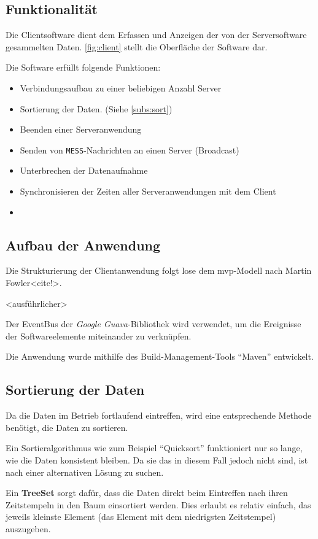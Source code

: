 \subsection{Funktionalität}
Die Clientsoftware dient dem Erfassen und Anzeigen der von der Serversoftware
gesammelten Daten. \autoref{fig:client} stellt die Oberfläche der Software dar.

\begin{minipage}[l]{\textwidth}
Die Software erfüllt folgende Funktionen:
\begin{itemize}
  \item Verbindungsaufbau zu einer beliebigen Anzahl Server
  \item Sortierung der Daten. (Siehe \autoref{subs:sort})
  \item Beenden einer Serveranwendung
  \item Senden von \texttt{MESS}-Nachrichten an einen Server (Broadcast)
  \item Unterbrechen der Datenaufnahme
  \item Synchronisieren der Zeiten aller Serveranwendungen mit dem Client
  \item <weitere Funktionen> 
\end{itemize}
\end{minipage}
\subsection{Aufbau der Anwendung}
Die Strukturierung der Clientanwendung folgt lose dem \gls{mvp}-Modell nach
Martin Fowler<cite!>.

<ausführlicher>

Der EventBus der \emph{Google Guava}-Bibliothek wird verwendet, um die
Ereignisse der Softwareelemente miteinander zu verknüpfen.

Die Anwendung wurde mithilfe des Build-Management-Tools "`Maven"'
entwickelt.
\subsection{Sortierung der Daten}\label{subs:sort}
Da die Daten im Betrieb fortlaufend eintreffen, wird eine entsprechende Methode
benötigt, die Daten zu sortieren.

Ein Sortieralgorithmus wie zum Beispiel "`Quicksort"' funktioniert nur so lange,
wie die Daten konsistent bleiben. Da sie das in diesem Fall jedoch nicht sind,
ist nach einer alternativen Lösung zu suchen.

Ein \textbf{TreeSet} sorgt dafür, dass die Daten direkt beim Eintreffen nach
ihren Zeitstempeln in den Baum einsortiert werden. Dies erlaubt es relativ
einfach, das jeweils kleinste Element (das Element mit dem niedrigsten
Zeitstempel) auszugeben. 

